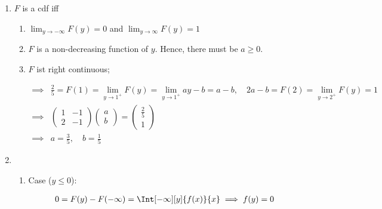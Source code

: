 \begin{solution}

\phantom{}

\begin{enumerate}[label = (\alph*)]

    \item $F$ is a cdf iff
    
    \begin{enumerate}[label = (\arabic*)]
        
        \item $\lim_{y \to -\infty} F(y) = 0$ and $\lim_{y \to \infty} F(y) = 1$
        
        \item $F$ is a non-decreasing function of $y$.
        Hence, there must be $a \geq 0$.

        \item $F$ ist right continuous;
        
        \begin{align*}
            \implies &
            \frac{2}{5} = F(1) = \lim_{y \to 1^+} F(y) = \lim_{y \to 1^+} a y - b = a - b,
            \quad
            2 a - b = F(2) = \lim_{y \to 2^+} F(y) = 1 \\
            \implies &
            \begin{pmatrix}
                1 & -1 \\ 2 & -1
            \end{pmatrix}
            \begin{pmatrix}
                a \\ b
            \end{pmatrix}
            =
            \begin{pmatrix}
                \frac{2}{5} \\ 1
            \end{pmatrix} \\
            \implies &
            a = \frac{3}{5}, \quad b = \frac{1}{5}
        \end{align*}

    \end{enumerate}

    \item

    \begin{enumerate}[label = \arabic*.]

        \item Case ($y \leq 0$):
        
        \begin{align*}
            0 = F(y) - F(-\infty) = \Int[-\infty][y]{f(x)}{x}
            \implies
            f(y) = 0
        \end{align*}


\end{enumerate}
\end{enumerate}
\end{solution}
